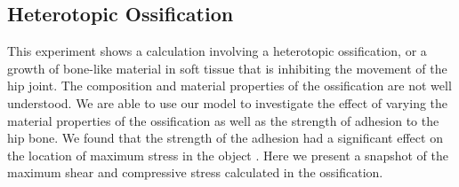 \documentclass{article}
\begin{document}
\subsection{Heterotopic Ossification}
\label{sec:ho}
This experiment shows a calculation involving a heterotopic ossification, or a growth of bone-like 
material in soft tissue that is inhibiting the movement of the hip joint.  The composition and material 
properties of the ossification are not well understood.  We are able to use our model to investigate the 
effect of varying the material properties of the ossification as well as the strength of adhesion to the hip 
bone.  We found that the strength of the adhesion had a significant effect on the location of maximum 
stress in the object \cite{kfagnan_mchang_ho}.  Here we present a snapshot of the maximum shear and 
compressive stress calculated in the ossification. 
\end{document}
